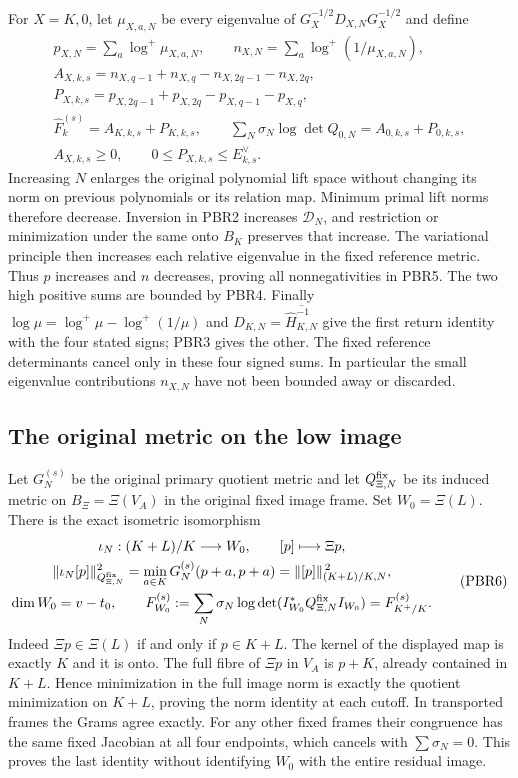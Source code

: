 \documentclass[11pt,a4paper]{article}
\begin{document}
For $X=K,0$, let $\mu_{X,a,N}$ be every eigenvalue of
$G_X^{-1/2}D_{X,N}G_X^{-1/2}$ and define
\[
\begin{gathered}
 p_{X,N}=\sum_a\log^+\mu_{X,a,N},\qquad
 n_{X,N}=\sum_a\log^+(1/\mu_{X,a,N}),\\
 A_{X,k,s}=n_{X,q-1}+n_{X,q}-n_{X,2q-1}-n_{X,2q},\\
 P_{X,k,s}=p_{X,2q-1}+p_{X,2q}-p_{X,q-1}-p_{X,q},\\
 \widehat F_k^{(s)}=A_{K,k,s}+P_{K,k,s},\qquad
 \sum_N\sigma_N\log\det Q_{0,N}=A_{0,k,s}+P_{0,k,s},\\
 A_{X,k,s}\ge0,\qquad 0\le P_{X,k,s}\le E_{k,s}^{\vee}.
\end{gathered}\tag{PBR5}
\]
Increasing $N$ enlarges the original polynomial lift space without
changing its norm on previous polynomials or its relation map.
Minimum primal lift norms therefore decrease. Inversion in PBR2
increases $\mathcal D_N$, and restriction or minimization under
the same onto $B_K$ preserves that increase. The variational
principle then increases each relative eigenvalue in the fixed
reference metric. Thus $p$ increases and $n$ decreases, proving
all nonnegativities in PBR5. The two high positive sums are bounded
by PBR4. Finally $\log\mu=\log^+\mu-\log^+(1/\mu)$ and
$D_{K,N}=\overline{\widehat H_{K,N}^{-1}}$ give the first return
identity with the four stated signs; PBR3 gives the other.
The fixed reference determinants cancel only in these four
signed sums. In particular the small eigenvalue contributions
$n_{X,N}$ have not been bounded away or discarded.

\subsection{The original metric on the low image}

Let $G_N^{(s)}$ be the original primary quotient metric and let
$Q_{\Xi,N}^{\rm fix}$ be its induced metric on $B_\Xi=\Xi(V_A)$
in the original fixed image frame. Set $W_0=\Xi(L)$.
There is the exact isometric isomorphism
\[
\begin{gathered}
 \iota_N:(K+L)/K\longrightarrow W_0,\qquad
 [p]\longmapsto\Xi p,\\
 \|\iota_N[p]\|_{Q_{\Xi,N}^{\rm fix}}^2
 =\min_{a\in K}G_N^{(s)}(p+a,p+a)
 =\|[p]\|_{(K+L)/K,N}^{\,2},\\
 \dim W_0=v-t_0,\qquad
 F_{W_0}^{(s)}
 :=\sum_N\sigma_N\log\det
       (I_{W_0}^*Q_{\Xi,N}^{\rm fix}I_{W_0})
 =F_{K^+/K}^{(s)}.
\end{gathered}\tag{PBR6}
\]
Indeed $\Xi p\in\Xi(L)$ if and only if $p\in K+L$.
The kernel of the displayed map is exactly $K$ and it is onto.
The full fibre of $\Xi p$ in $V_A$ is $p+K$, already contained
in $K+L$. Hence minimization in the full image norm is exactly
the quotient minimization on $K+L$, proving the norm identity
at each cutoff. In transported frames the Grams agree exactly.
For any other fixed frames their congruence has the same fixed
Jacobian at all four endpoints, which cancels with $\sum\sigma_N=0$.
This proves the last identity without identifying $W_0$ with
the entire residual image.
\end{document}
